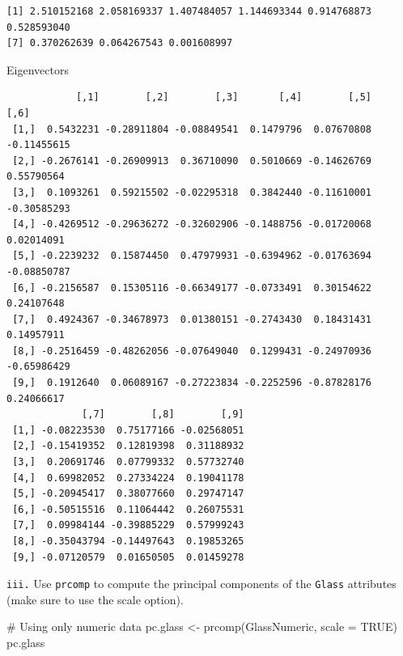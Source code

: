 \documentclass[
  letterpaper,
  DIV=11,
  numbers=noendperiod]{scrartcl}
\newenvironment{Shaded}{}{}
\newcommand{\AttributeTok}[1]{\textcolor[rgb]{0.84,0.23,0.29}{#1}}
\newcommand{\CommentTok}[1]{\textcolor[rgb]{0.42,0.45,0.49}{#1}}
\newcommand{\ConstantTok}[1]{\textcolor[rgb]{0.00,0.36,0.77}{#1}}
\newcommand{\FunctionTok}[1]{\textcolor[rgb]{0.44,0.26,0.76}{#1}}
\newcommand{\NormalTok}[1]{\textcolor[rgb]{0.14,0.16,0.18}{#1}}
\newcommand{\OtherTok}[1]{\textcolor[rgb]{0.44,0.26,0.76}{#1}}
\newcommand{\SpecialCharTok}[1]{\textcolor[rgb]{0.00,0.36,0.77}{#1}}
\begin{document}
\begin{verbatim}
[1] 2.510152168 2.058169337 1.407484057 1.144693344 0.914768873 0.528593040
[7] 0.370262639 0.064267543 0.001608997
\end{verbatim}

Eigenvectors

\begin{Shaded}
\end{Shaded}

\begin{verbatim}
            [,1]        [,2]        [,3]       [,4]        [,5]        [,6]
 [1,]  0.5432231 -0.28911804 -0.08849541  0.1479796  0.07670808 -0.11455615
 [2,] -0.2676141 -0.26909913  0.36710090  0.5010669 -0.14626769  0.55790564
 [3,]  0.1093261  0.59215502 -0.02295318  0.3842440 -0.11610001 -0.30585293
 [4,] -0.4269512 -0.29636272 -0.32602906 -0.1488756 -0.01720068  0.02014091
 [5,] -0.2239232  0.15874450  0.47979931 -0.6394962 -0.01763694 -0.08850787
 [6,] -0.2156587  0.15305116 -0.66349177 -0.0733491  0.30154622  0.24107648
 [7,]  0.4924367 -0.34678973  0.01380151 -0.2743430  0.18431431  0.14957911
 [8,] -0.2516459 -0.48262056 -0.07649040  0.1299431 -0.24970936 -0.65986429
 [9,]  0.1912640  0.06089167 -0.27223834 -0.2252596 -0.87828176  0.24066617
             [,7]        [,8]        [,9]
 [1,] -0.08223530  0.75177166 -0.02568051
 [2,] -0.15419352  0.12819398  0.31188932
 [3,]  0.20691746  0.07799332  0.57732740
 [4,]  0.69982052  0.27334224  0.19041178
 [5,] -0.20945417  0.38077660  0.29747147
 [6,] -0.50515516  0.11064442  0.26075531
 [7,]  0.09984144 -0.39885229  0.57999243
 [8,] -0.35043794 -0.14497643  0.19853265
 [9,] -0.07120579  0.01650505  0.01459278
\end{verbatim}

\texttt{iii.} Use \texttt{prcomp} to compute the principal components of
the \texttt{Glass} attributes (make sure to use the scale option).

\begin{Shaded}
\begin{Highlighting}[]
\CommentTok{\# Using only numeric data}
\NormalTok{pc.glass }\OtherTok{\textless{}{-}} \FunctionTok{prcomp}\NormalTok{(GlassNumeric, }\AttributeTok{scale =} \ConstantTok{TRUE}\NormalTok{)}
\NormalTok{pc.glass}
\end{Highlighting}
\end{Shaded}
\end{document}
